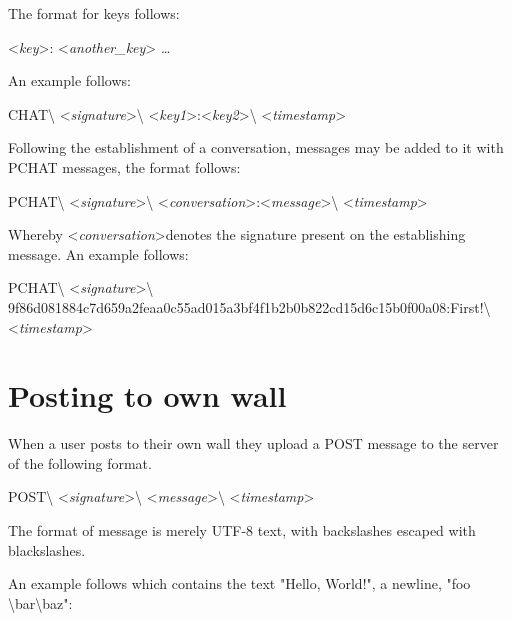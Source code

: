 The format for keys follows:

\begin{center}
\textless \textit{key}\textgreater:
\textless \textit{another\_key}\textgreater
\ldots
\end{center}

An example follows:

\begin{center}
CHAT\textbackslash
\textless \textit{signature}\textgreater\textbackslash
\textless \textit{key1}\textgreater:\textless \textit{key2}\textgreater\textbackslash
\textless \textit{timestamp}\textgreater
\end{center}

Following the establishment of a conversation, messages may be added to it with
PCHAT messages, the format follows:

\begin{center}
PCHAT\textbackslash
\textless \textit{signature}\textgreater\textbackslash
\textless \textit{conversation}\textgreater:\textless \textit{message}\textgreater\textbackslash
\textless \textit{timestamp}\textgreater
\end{center}

Whereby \textless \textit{conversation}\textgreater denotes the signature
present on the establishing message. An example follows:

\begin{center}
PCHAT\textbackslash
\textless \textit{signature}\textgreater\textbackslash
9f86d081884c7d659a2feaa0c55ad015a3bf4f1b2b0b822cd15d6c15b0f00a08:First!\textbackslash
\textless \textit{timestamp}\textgreater
\end{center}

\section{Posting to own wall}
When a user posts to their own wall they upload a POST message to the server of
the following format.

\begin{center}
POST\textbackslash
\textless \textit{signature}\textgreater\textbackslash
\textless \textit{message}\textgreater\textbackslash
\textless \textit{timestamp}\textgreater
\end{center}

The format of message is merely UTF-8 text, with backslashes escaped with
blackslashes.

An example follows which contains the text "Hello, World!", a newline, "foo
\textbackslash bar\textbackslash baz":

